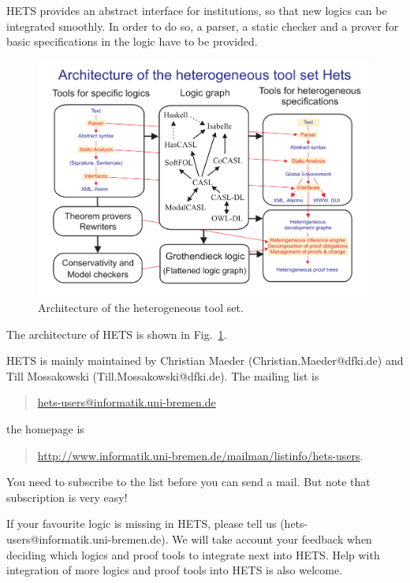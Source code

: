 \documentclass{article}
\newcommand{\normalTEXTSC}[2]{{#1\scriptsize#2}}
\newcommand     {\Hets}{\normalTEXTSC{H}{ETS}\xspace}
\begin{document}
\Hets provides an abstract interface for 
institutions, so
that new logics can be integrated smoothly. 
In order to do so, a parser,
a static checker and a prover for basic specifications in the logic have
to be provided.



\begin{figure}
\begin{center}
\includegraphics[scale=0.4]{hets2007}
\end{center}
%
\caption{Architecture of the heterogeneous tool set.
\label{fig:hets}}
\end{figure}

The architecture of \Hets is shown in Fig.~\ref{fig:hets}. 


\Hets is mainly maintained by
Christian Maeder (Christian.Maeder@dfki.de) and Till Mossakowski
(Till.Mossakowski@dfki.de). The mailing list is
\begin{quote}
 \url{hets-users@informatik.uni-bremen.de}
\end{quote}
the homepage is
\begin{quote}
\url{http://www.informatik.uni-bremen.de/mailman/listinfo/hets-users}.
\end{quote}

You need to subscribe to the list before you can send a mail.
But note that subscription is very easy!

If your favourite logic is missing in \Hets, please tell us
(hets-users@informatik.uni-bremen.de). We will take account your
feedback when deciding which logics and proof tools to integrate next
into \Hets. Help with integration of more logics and proof tools into
\Hets is also welcome.
\end{document}
